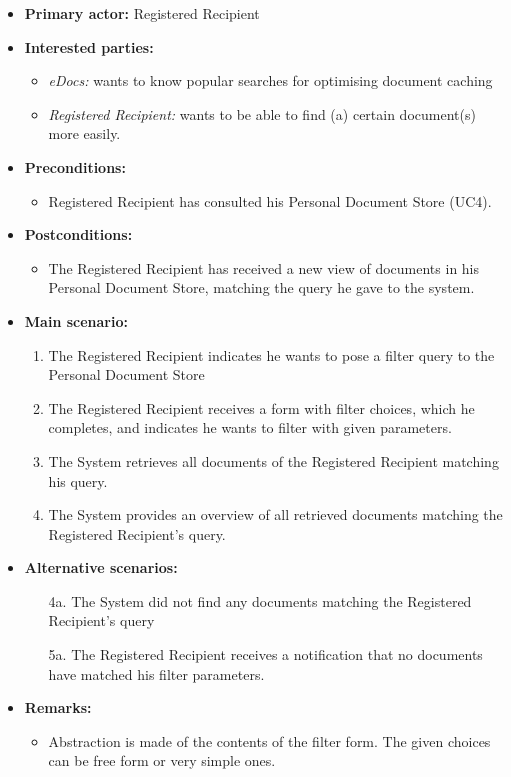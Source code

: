 \documentclass[a4paper,10pt]{article}
\begin{document}
\begin{itemize}
    \item \textbf{Primary actor:} Registered Recipient
    \item \textbf{Interested parties:} 
        \begin{itemize}
            \item \textit{eDocs:} wants to know popular searches for optimising document caching
            \item \textit{Registered Recipient:} wants to be able to find (a) certain document(s) more easily.
        \end{itemize}

    \item \textbf{Preconditions:}
        \begin{itemize}
            \item Registered Recipient has consulted his Personal Document Store (UC4).
        \end{itemize}

    \item \textbf{Postconditions:}
        \begin{itemize}
            \item The Registered Recipient has received a new view of documents in his Personal Document Store, matching the query he gave to the system.
        \end{itemize}
        
    \item \textbf{Main scenario:} 
    \begin{enumerate}
       \item The Registered Recipient indicates he wants to pose a filter query to the Personal Document Store
       \item The Registered Recipient receives a form with filter choices, which he completes, and indicates he wants to filter with given parameters.
       \item The System retrieves all documents of the Registered Recipient matching his query.
       \item The System provides an overview of all retrieved documents matching the Registered Recipient's query.
    \end{enumerate}

    \item \textbf{Alternative scenarios:} 
    \begin{enumerate}
        \item [4a.] The System did not find any documents matching the Registered Recipient's query
        \item [5a.] The Registered Recipient receives a notification that no documents have matched his filter parameters.
    \end{enumerate}
    
    \item \textbf{Remarks:}
        \begin{itemize}
            \item Abstraction is made of the contents of the filter form. The given choices can be free form or very simple ones.
        \end{itemize}
\end{itemize}
\end{document}

